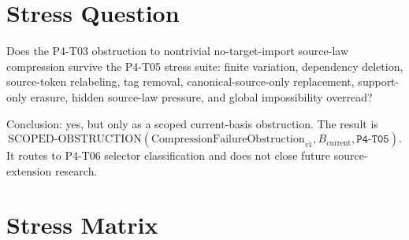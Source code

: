 \documentclass[11pt]{article}
\newcommand{\Obstruction}{\mathrm{CompressionFailureObstruction}_{v1}}
\newcommand{\Bcur}{B_{\mathrm{current}}}
\newcommand{\ScopedObstruction}{\mathrm{SCOPED\mbox{-}OBSTRUCTION}}
\begin{document}
\section{Stress Question}

Does the P4-T03 obstruction to nontrivial no-target-import source-law
compression survive the P4-T05 stress suite: finite variation, dependency
deletion, source-token relabeling, tag removal, canonical-source-only
replacement, support-only erasure, hidden source-law pressure, and global
impossibility overread?

Conclusion: yes, but only as a scoped current-basis obstruction. The result is
\[
  \ScopedObstruction(\Obstruction,\Bcur,\texttt{P4-T05}).
\]
It routes to P4-T06 selector classification and does not close future
source-extension research.

\section{Stress Matrix}
\end{document}
